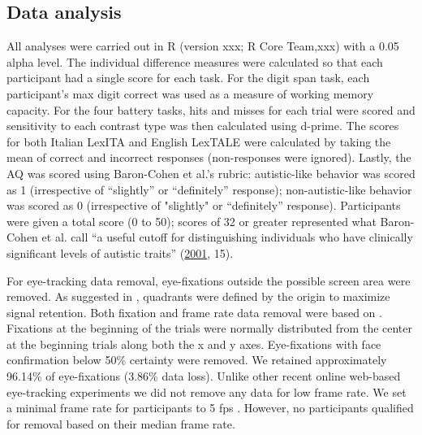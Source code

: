 \subsection{Data analysis}

All analyses were carried out in R (version xxx; R Core Team,xxx) with a 0.05 alpha level. The individual difference measures were calculated so that each participant had a single score for each task. For the digit span task, each participant's max digit correct was used as a measure of working memory capacity. For the four battery tasks, hits and misses for each trial were scored and sensitivity to each contrast type was then calculated using d-prime. The scores for both Italian LexITA and English LexTALE were calculated by taking the mean of correct and incorrect responses (non-responses were ignored). Lastly, the AQ was scored using Baron-Cohen et al.'s rubric: autistic-like behavior was scored as 1 (irrespective of “slightly” or “definitely” response); non-autistic-like behavior was scored as 0 (irrespective of "slightly" or “definitely” response). Participants were given a total score (0 to 50); scores of 32 or greater represented what Baron-Cohen et al. call “a useful cutoff for distinguishing individuals who have clinically significant levels of autistic traits” (\href{https://cognitiveresearchjournal.springeropen.com/articles/10.1186/s41235-022-00439-w\#ref-CR5}{2001}, 15).

For eye-tracking data removal, eye-fixations outside the possible screen area were removed. As suggested in \cite{bramlett_wiener_24-AOW}, quadrants were defined by the origin to maximize signal retention. Both fixation and frame rate data removal were based on \cite{bramlett_wiener_24-AOW}. Fixations at the beginning of the trials were normally distributed from the center at the beginning trials along both the x and y axes. Eye-fixations with face confirmation below 50\% certainty were removed. We retained approximately 96.14\% of eye-fixations (3.86\% data loss). Unlike other recent online web-based eye-tracking experiments we did not remove any data for low frame rate. We set a minimal frame rate for participants to 5 fps \citep{Vos_2017}. However, no participants qualified for removal based on their median frame rate. 


